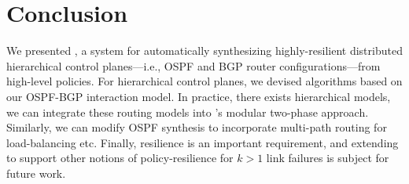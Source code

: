 \section{Conclusion}
We presented \name, a system for automatically synthesizing 
highly-resilient distributed hierarchical control planes---i.e., OSPF and 
BGP router configurations---from
high-level policies. For hierarchical control planes, 
we devised algorithms based on our OSPF-BGP interaction model. In 
practice, there exists hierarchical models, we can integrate these routing
models into \name's modular two-phase approach.
Similarly, we can modify OSPF synthesis to incorporate multi-path routing
for load-balancing etc. Finally, resilience is an important requirement, 
and extending \name to support other notions of policy-resilience
for $k > 1$ link failures is subject for future work.